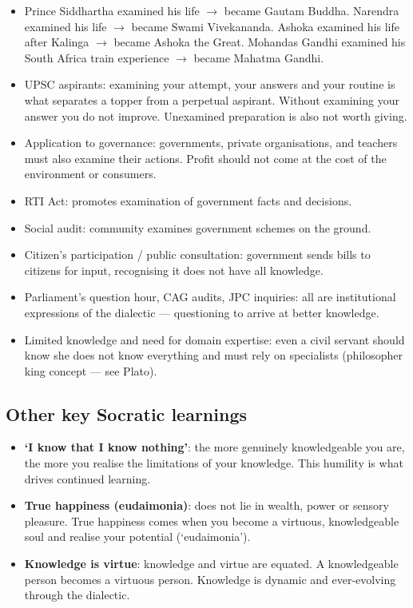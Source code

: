 \begin{ExampleBox}
\begin{itemize}
\item Prince Siddhartha examined his life $\rightarrow$ became Gautam Buddha. Narendra examined his life $\rightarrow$ became Swami Vivekananda. Ashoka examined his life after Kalinga $\rightarrow$ became Ashoka the Great. Mohandas Gandhi examined his South Africa train experience $\rightarrow$ became Mahatma Gandhi.
\item UPSC aspirants: examining your attempt, your answers and your routine is what separates a topper from a perpetual aspirant. Without examining your answer you do not improve. Unexamined preparation is also not worth giving.
\item Application to governance: governments, private organisations, and teachers must also examine their actions. Profit should not come at the cost of the environment or consumers.
\end{itemize}
\end{ExampleBox}

\begin{GovtPolicy}
\begin{itemize}
\item RTI Act: promotes examination of government facts and decisions.
\item Social audit: community examines government schemes on the ground.
\item Citizen's participation / public consultation: government sends bills to citizens for input, recognising it does not have all knowledge.
\item Parliament's question hour, CAG audits, JPC inquiries: all are institutional expressions of the dialectic --- questioning to arrive at better knowledge.
\item Limited knowledge and need for domain expertise: even a civil servant should know she does not know everything and must rely on specialists (philosopher king concept --- see Plato).
\end{itemize}
\end{GovtPolicy}

\subsection*{Other key Socratic learnings}
\begin{itemize}
\item \textbf{`I know that I know nothing'}: the more genuinely knowledgeable you are, the more you realise the limitations of your knowledge. This humility is what drives continued learning.
\item \textbf{True happiness (eudaimonia)}: does not lie in wealth, power or sensory pleasure. True happiness comes when you become a virtuous, knowledgeable soul and realise your potential (`eudaimonia').
\item \textbf{Knowledge is virtue}: knowledge and virtue are equated. A knowledgeable person becomes a virtuous person. Knowledge is dynamic and ever-evolving through the dialectic.
\end{itemize}

